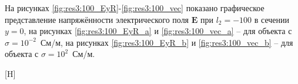 \documentclass[a4paper,14pt]{article}
\makeatletter
\renewenvironment{figure}[1][\fps@figure]{
  \edef\@tempa{\noexpand\@float{figure}[#1]}
  \@tempa
  \addtocounter{foofigure}{1}
}{
  \end@float
}
\renewcommand{\Re}{\mathop{\mathrm{Re}}\nolimits}
\makeatother
\begin{document}
На рисунках \ref{fig:res3:100_EyR}-\ref{fig:res3:100_vec} показано графическое представление напряжённости электрического поля $\mathbf{E}$ при $l_2=-100$ в сечении $y=0$, на рисунках \ref{fig:res3:100_EyR_a} и \ref{fig:res3:100_vec_a} -- для объекта с $\sigma=10^{-2}$~См/м, на рисунках \ref{fig:res3:100_EyR_b} и \ref{fig:res3:100_vec_b} -- для объекта с $\sigma=10^{2}$~См/м.

\begin{figure}[H]
	\centering
	\text{~~}
	\caption{$\Re(\mathbf{E}_y)$ при $l_2=-100$}
	\label{fig:res3:100_EyR}
\end{figure}
\end{document}
